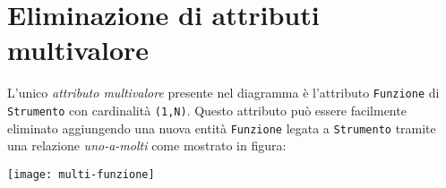 \section{Eliminazione di attributi multivalore}\label{sec:multivalue}
L'unico {\it attributo multivalore} presente nel diagramma è l'attributo {\tt Funzione} di {\tt Strumento}
con cardinalità {\tt (1,N)}. Questo attributo può essere facilmente eliminato aggiungendo
una nuova entità {\tt Funzione} legata a {\tt Strumento} tramite una relazione {\it uno-a-molti}
come mostrato in figura:

\vspace{5pt}\centerline{\texttt{[image: multi-funzione]}}

